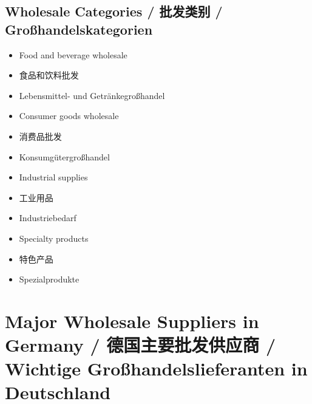 \subsection{Wholesale Categories / 批发类别 / Großhandelskategorien}
\begin{itemize}
    \item Food and beverage wholesale
    \item 食品和饮料批发
    \item Lebensmittel- und Getränkegroßhandel
    \item Consumer goods wholesale
    \item 消费品批发
    \item Konsumgütergroßhandel
    \item Industrial supplies
    \item 工业用品
    \item Industriebedarf
    \item Specialty products
    \item 特色产品
    \item Spezialprodukte
\end{itemize}

\section{Major Wholesale Suppliers in Germany / 德国主要批发供应商 / Wichtige Großhandelslieferanten in Deutschland}

